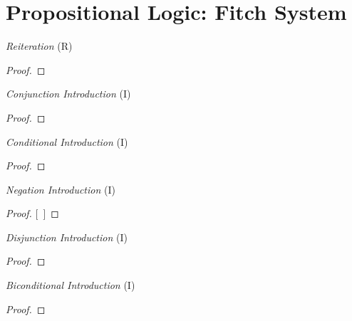\documentclass[a4paper, 11pt]{article} %
\begin{document}
\section*{\sc Propositional Logic: Fitch System}


\vspace{-.25in}
\begin{multicols}{2}\footnotesize

  \textit{Reiteration} (R)
  \begin{proof}
     
  \end{proof}
  \medskip

  \textit{Conjunction Introduction} (\eand I)
  \begin{proof}
     
     
  \end{proof}
  \medskip

  \textit{Conditional Introduction} (\eif I)
  \begin{proof}
    \open
    \close
  \end{proof}
  \medskip

  \textit{Negation Introduction} (\enot I)
  \begin{proof}
  \open
    \metaA {}   %
    \metaB
  \close
  [\ ]{\enot\metaA}
  \end{proof}
  \medskip

  \textit{Disjunction Introduction} (\eor I)
  \begin{proof}
  \end{proof}
  \medskip

  \textit{Biconditional Introduction} (\eiff I)
  \begin{proof}
    \open
       
    \close
    \open
       
    \close
  \end{proof}
  \medskip


\end{multicols}
\end{document}
